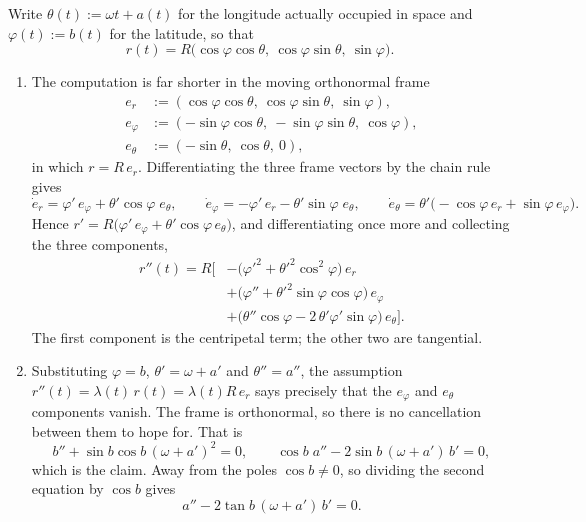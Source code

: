 \begin{exercisesolution}
\label{sol:curve_chain_rule_car_earth}
Write $\theta(t) := \omega t + a(t)$ for the longitude actually occupied in space and
$\varphi(t) := b(t)$ for the latitude, so that
\[r(t) = R\big(\cos\varphi\cos\theta,\ \cos\varphi\sin\theta,\ \sin\varphi\big).\]
\begin{enumerate}[label=\textbf{(\alph*)}]
  \item The computation is far shorter in the moving orthonormal frame
    \begin{align*}
      e_r      &:= (\cos\varphi\cos\theta,\ \cos\varphi\sin\theta,\ \sin\varphi), \\
      e_\varphi&:= (-\sin\varphi\cos\theta,\ -\sin\varphi\sin\theta,\ \cos\varphi), \\
      e_\theta &:= (-\sin\theta,\ \cos\theta,\ 0),
    \end{align*}
    in which $r = R\,e_r$. Differentiating the three frame vectors by the chain rule gives
    \[\dot e_r = \varphi'\,e_\varphi + \theta'\cos\varphi\;e_\theta, \qquad
      \dot e_\varphi = -\varphi'\,e_r - \theta'\sin\varphi\;e_\theta, \qquad
      \dot e_\theta = \theta'\big({-}\cos\varphi\,e_r + \sin\varphi\,e_\varphi\big).\]
    Hence $r' = R\big(\varphi'\,e_\varphi + \theta'\cos\varphi\,e_\theta\big)$, and
    differentiating once more and collecting the three components,
    \begin{align*}
      r''(t) = R\Big[&-\big(\varphi'^2 + \theta'^2\cos^2\varphi\big)\,e_r \\
        &+ \big(\varphi'' + \theta'^2\sin\varphi\cos\varphi\big)\,e_\varphi \\
        &+ \big(\theta''\cos\varphi - 2\,\theta'\varphi'\sin\varphi\big)\,e_\theta\Big].
    \end{align*}
    The first component is the centripetal term; the other two are tangential.
  \item Substituting $\varphi = b$, $\theta' = \omega + a'$ and $\theta'' = a''$, the assumption
    $r''(t) = \lambda(t)\,r(t) = \lambda(t)R\,e_r$ says precisely that the $e_\varphi$ and
    $e_\theta$ components vanish. The frame is orthonormal, so there is no cancellation between
    them to hope for. That is
    \[b'' + \sin b\cos b\,(\omega+a')^2 = 0, \qquad
      \cos b\;a'' - 2\sin b\,(\omega+a')\,b' = 0,\]
    which is the claim. Away from the poles $\cos b \neq 0$, so dividing the second equation by
    $\cos b$ gives
    \[a'' - 2\tan b\,(\omega+a')\,b' = 0.\]
\end{enumerate}


\end{exercisesolution}
